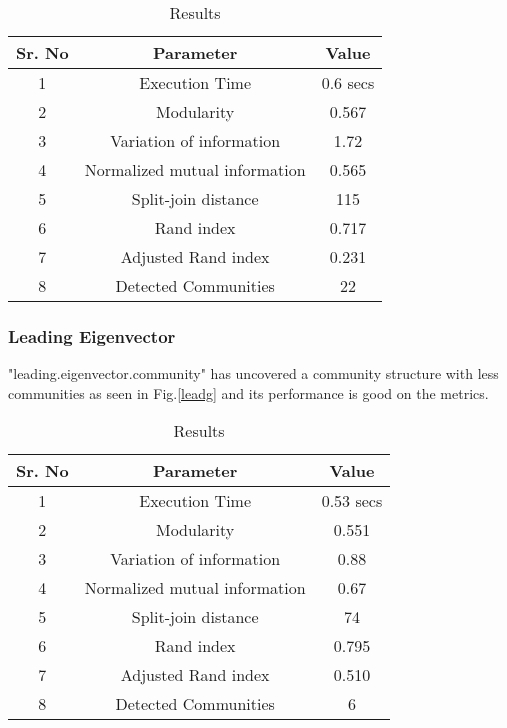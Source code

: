 \begin{table}[H]
\renewcommand{\arraystretch}{1.3}
\caption{Results}
\label{table}
\centering
\begin{tabular}{|c|c|c|}
  \hline
\multicolumn{1}{|c|}{\textbf{Sr. No}} & \multicolumn{1}{c|}{\textbf{Parameter}} & \multicolumn{1}{c|}{\textbf{Value}} \\
  \hline
  1 & Execution Time &  0.6 secs \\
   \hline
  2 & Modularity &  0.567 \\
   \hline
  3 & Variation of information &  1.72 \\
   \hline
  4 & Normalized mutual information &  0.565 \\
   \hline
  5 & Split-join distance &  115 \\
   \hline
  6 & Rand index &  0.717 \\
   \hline
  7 & Adjusted Rand index &  0.231 \\
  \hline
   8 & Detected Communities &  22 \\
  \hline
\end{tabular}
\end{table}

\subsubsection{Leading Eigenvector}
"leading.eigenvector.community" has uncovered a community structure with less communities as seen in Fig.\ref{leadg} and its performance is good on the metrics. 

\begin{table}[H]
\renewcommand{\arraystretch}{1.3}
\caption{Results}
\label{table}
\centering
\begin{tabular}{|c|c|c|}
  \hline
\multicolumn{1}{|c|}{\textbf{Sr. No}} & \multicolumn{1}{c|}{\textbf{Parameter}} & \multicolumn{1}{c|}{\textbf{Value}} \\
  \hline
  1 & Execution Time &  0.53 secs \\
   \hline
  2 & Modularity &  0.551 \\
   \hline
  3 & Variation of information &  0.88 \\
   \hline
  4 & Normalized mutual information &  0.67 \\
   \hline
  5 & Split-join distance &  74 \\
   \hline
  6 & Rand index &  0.795 \\
   \hline
  7 & Adjusted Rand index &  0.510 \\
  \hline
   8 & Detected Communities &  6 \\
  \hline
\end{tabular}
\end{table}

